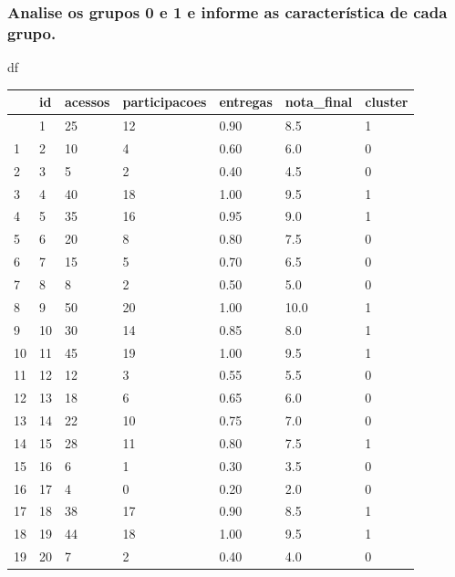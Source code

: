 \documentclass[
  letterpaper,
  DIV=11,
  numbers=noendperiod]{scrartcl}
\newenvironment{Shaded}{\begin{snugshade}}{\end{snugshade}}
\newcommand{\NormalTok}[1]{\textcolor[rgb]{0.00,0.23,0.31}{#1}}
\begin{document}
\subsubsection{Analise os grupos 0 e 1 e informe as característica de
cada
grupo.}\label{analise-os-grupos-0-e-1-e-informe-as-caracteruxedstica-de-cada-grupo.}

\begin{Shaded}
\begin{Highlighting}[]
\NormalTok{df}
\end{Highlighting}
\end{Shaded}

\begin{longtable}[]{@{}lllllll@{}}
\toprule\noalign{}
& id & acessos & participacoes & entregas & nota\_final & cluster \\
\midrule\noalign{}
\endhead
\bottomrule\noalign{}
\endlastfoot
0 & 1 & 25 & 12 & 0.90 & 8.5 & 1 \\
1 & 2 & 10 & 4 & 0.60 & 6.0 & 0 \\
2 & 3 & 5 & 2 & 0.40 & 4.5 & 0 \\
3 & 4 & 40 & 18 & 1.00 & 9.5 & 1 \\
4 & 5 & 35 & 16 & 0.95 & 9.0 & 1 \\
5 & 6 & 20 & 8 & 0.80 & 7.5 & 0 \\
6 & 7 & 15 & 5 & 0.70 & 6.5 & 0 \\
7 & 8 & 8 & 2 & 0.50 & 5.0 & 0 \\
8 & 9 & 50 & 20 & 1.00 & 10.0 & 1 \\
9 & 10 & 30 & 14 & 0.85 & 8.0 & 1 \\
10 & 11 & 45 & 19 & 1.00 & 9.5 & 1 \\
11 & 12 & 12 & 3 & 0.55 & 5.5 & 0 \\
12 & 13 & 18 & 6 & 0.65 & 6.0 & 0 \\
13 & 14 & 22 & 10 & 0.75 & 7.0 & 0 \\
14 & 15 & 28 & 11 & 0.80 & 7.5 & 1 \\
15 & 16 & 6 & 1 & 0.30 & 3.5 & 0 \\
16 & 17 & 4 & 0 & 0.20 & 2.0 & 0 \\
17 & 18 & 38 & 17 & 0.90 & 8.5 & 1 \\
18 & 19 & 44 & 18 & 1.00 & 9.5 & 1 \\
19 & 20 & 7 & 2 & 0.40 & 4.0 & 0 \\
\end{longtable}
\end{document}
